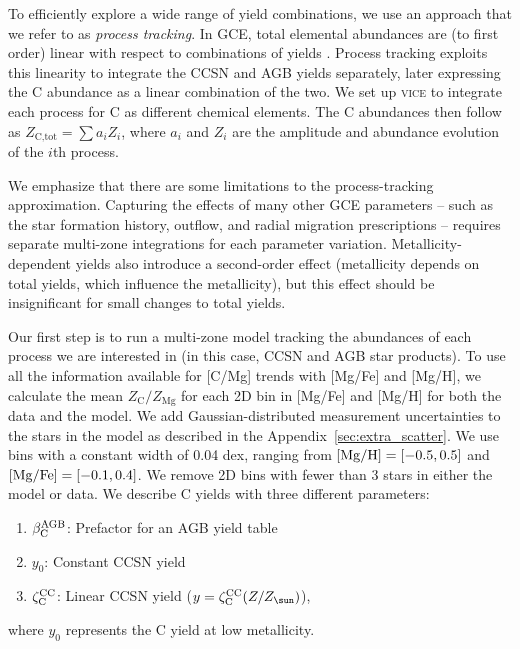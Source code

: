 \documentclass[fleqn,
usenatbib]{mnras}
\newcommand{\VICE}{\textsc{vice}}
\newcommand{\aagb}{\beta_{\rm C}^{\rm AGB}}
\newcommand{\yo}{y_0}
\newcommand{\zcc}{\zeta_{\rm C}^{\rm CC}}
\newcommand{\Zo}{ Z_{\sun}}
\begin{document}
{To efficiently explore a wide range of yield combinations, we use an approach that we refer to as {\it process tracking}. In GCE, total elemental abundances are (to first order) linear with respect to combinations of yields \citep[e.g.,][]{WAF17}. 
Process tracking exploits this linearity to integrate the CCSN and AGB yields separately, later expressing the C abundance as a linear combination of the two.
We set up \VICE {} to integrate each process for C as different chemical elements.
The C abundances then follow as $Z_\text{C,tot} = \sum a_i Z_i$, where $a_i$ and $Z_i$ are the amplitude and abundance evolution of the $i$th process. 

We emphasize that there are some limitations to the process-tracking approximation. Capturing the effects of many other GCE parameters -- such as the star formation history, outflow, and radial migration prescriptions --  requires separate multi-zone integrations for each parameter variation. 
Metallicity-dependent yields also introduce a second-order effect (metallicity depends on total yields, which influence the metallicity), but this effect should be insignificant for small changes to total yields.

Our first step is to run a multi-zone model tracking the abundances of each process we are interested in (in this case, CCSN and AGB star products). 
To use all the information available for [C/Mg] trends with [Mg/Fe] and [Mg/H], we calculate the mean $Z_\text{C} / Z_\text{Mg}$ for each 2D bin in [Mg/Fe] and [Mg/H] for both the data and the model. We add Gaussian-distributed measurement uncertainties to the stars in the model as described in the Appendix~\ref{sec:extra_scatter}.  We use bins with a constant width of 0.04 dex, ranging from ${\rm [Mg/H]}=[-0.5, 0.5]$ and ${\rm [Mg/Fe]} = [-0.1, 0.4]$. We remove 2D bins with fewer than 3 stars in either the model or data.
We describe C yields with three different parameters:
\begin{enumerate}
    \item $\aagb$: Prefactor for an AGB yield table
    \item $\yo$: Constant CCSN yield
    \item $\zcc$: Linear CCSN yield ($y = \zcc (Z/\Zo)$),
\end{enumerate}
where $\yo$ represents the C yield at low metallicity. 



}
\end{document}
